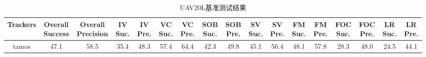 \begin{table}[h]
\centering
\caption{UAV20L基准测试结果}
\begin{tabular}{ccccccccccccccccc}
\hline
Trackers & Overall Success & Overall Precision & IV Suc. & IV Pre. & VC Suc. & VC Pre. & SOB Suc. & SOB Pre. & SV Suc. & SV Pre. & FM Suc. & FM Pre. & FOC Suc. & FOC Pre. & LR Suc. & LR Pre. \\
\hline
tamos & 47.1 & 58.5 & 35.4 & 48.3 & 57.4 & 64.4 & 42.3 & 49.8 & 45.1 & 56.4 & 48.1 & 57.8 & 28.3 & 48.0 & 24.5 & 44.1 \\
\hline
\end{tabular}
\end{table}
